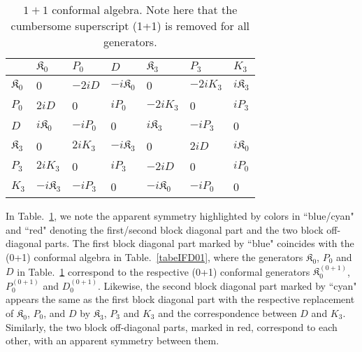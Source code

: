 \documentclass[%
 reprint,
superscriptaddress,
 amsmath,amssymb,
 aps,
]{revtex4-2}
\begin{document}
\begin{table}[h!]
\centering
\setlength{\tabcolsep}{0pt} 
\caption{\label{tabelinterpolationifd}
$1+1$ conformal algebra. Note here that the cumbersome superscript (1+1) is removed for all generators.}
\begin{tabular}{ |>{\centering\arraybackslash}p{1cm}||>{\centering\arraybackslash}p{1cm}|>{\centering\arraybackslash}p{1cm}|>{\centering\arraybackslash}p{1cm}|>{\centering\arraybackslash}p{1cm}|>{\centering\arraybackslash}p{1cm}|>{\centering\arraybackslash}p{1cm}| } 
 \hline
\rule{0pt}{16pt} & $\mathfrak{K}_{{0}}$   & $P_{{0}}$ &  $D$& $\mathfrak{K}_{{3}}$ & $P_{{3}}$& $K_{{3}}$\\
 \hline
  \hline
 \rule{0pt}{16pt}$\mathfrak{K}_{{0}}$ & \cellcolor{blue!20}0&\cellcolor{blue!20}$-2iD$&\cellcolor{blue!20}$-i\mathfrak{K}_{{0}}$&\cellcolor{red!20}0&\cellcolor{red!20}$-2iK_{{3}}$&\cellcolor{red!20}${i\mathfrak{K}_{{3}}}$\\
  \hline 
 \rule{0pt}{16pt}  $P_{{0}}$ &\cellcolor{blue!20}$2iD$&\cellcolor{blue!20}0&\cellcolor{blue!20}$iP_{{0}}$&\cellcolor{red!20}${-2iK_{{3}}}$&\cellcolor{red!20}0&\cellcolor{red!20}${iP_{{3}}}$\\
 \hline
 \rule{0pt}{16pt}$D$ &\cellcolor{blue!20}$i\mathfrak{K}_{{0}}$&\cellcolor{blue!20}$-iP_{{0}}$&\cellcolor{blue!20}0&\cellcolor{red!20}$i\mathfrak{K}_{{3}}$&\cellcolor{red!20}$-iP_{{3}}$&\cellcolor{red!20}0\\
 \hline
 \rule{0pt}{16pt}$\mathfrak{K}_{{3}}$ &\cellcolor{red!20}0&\cellcolor{red!20}${2iK_{{3}}}$&\cellcolor{red!20}$-i\mathfrak{K}_{{3}}$&\cellcolor{cyan!20}0&\cellcolor{cyan!20}$2iD$&\cellcolor{cyan!20}${i\mathfrak{K}_{{0}}}$\\
 \hline 
 \rule{0pt}{16pt}$P_{{3}}$ &\cellcolor{red!20}$2iK_{{3}}$&\cellcolor{red!20}0&\cellcolor{red!20}$iP_{{3}}$&\cellcolor{cyan!20}$-2iD$&\cellcolor{cyan!20}0&\cellcolor{cyan!20}${iP_{{0}}}$\\
 \hline 
 \rule{0pt}{16pt}$K_{{3}}$ &\cellcolor{red!20}${-i\mathfrak{K}_{{3}}}$&\cellcolor{red!20}${-iP_{{3}}}$&\cellcolor{red!20}0&\cellcolor{cyan!20}${-i\mathfrak{K}_{{0}}}$&\cellcolor{cyan!20}${-iP_{{0}}}$&\cellcolor{cyan!20}0\\
 \hline 
\end{tabular}
\end{table}

In Table.~\ref{tabelinterpolationifd}, we note the apparent symmetry highlighted by colors in ``blue/cyan" and ``red" denoting the first/second block diagonal part and the two block off-diagonal parts. The first block diagonal part marked by ``blue" coincides with the (0+1) conformal algebra in Table.~\ref{tabeIFD01}, where the generators $\mathfrak{K}_{{0}}$, $P_0$ and $D$ in Table.~\ref{tabelinterpolationifd} correspond to the respective (0+1) conformal generators $\mathfrak{K}^{(0+1)}_{{0}}$, $P^{(0+1)}_{0}$ and $D^{(0+1)}_{0}$. Likewise, the second block diagonal part marked by ``cyan" appears the same as the first block diagonal part with the respective replacement of $\mathfrak{K}_{{0}}$, $P_0$, and $D$ by 
$\mathfrak{K}_{{3}}$, $P_3$ and $K_3$ and the correspondence between $D$ and $K_3$. Similarly, the two block off-diagonal parts, marked in red, correspond to each other, with an apparent symmetry between them. 
\end{document}
